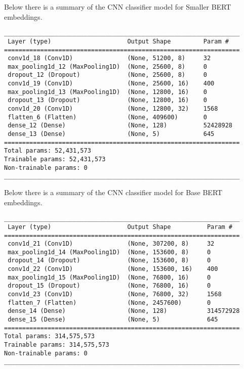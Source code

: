 Below there is a summary of the CNN classifier model for Smaller BERT embeddings.
\begin{verbatim}
_________________________________________________________________
 Layer (type)                     Output Shape         Param #   
=================================================================
 conv1d_18 (Conv1D)               (None, 51200, 8)     32        
 max_pooling1d_12 (MaxPooling1D)  (None, 25600, 8)     0                                    
 dropout_12 (Dropout)             (None, 25600, 8)     0         
 conv1d_19 (Conv1D)               (None, 25600, 16)    400       
 max_pooling1d_13 (MaxPooling1D)  (None, 12800, 16)    0                                    
 dropout_13 (Dropout)             (None, 12800, 16)    0         
 conv1d_20 (Conv1D)               (None, 12800, 32)    1568      
 flatten_6 (Flatten)              (None, 409600)       0         
 dense_12 (Dense)                 (None, 128)          52428928  
 dense_13 (Dense)                 (None, 5)            645       
=================================================================
Total params: 52,431,573
Trainable params: 52,431,573
Non-trainable params: 0
_________________________________________________________________

\end{verbatim}

Below there is a summary of the CNN classifier model for Base BERT embeddings.
\begin{verbatim}
_________________________________________________________________
 Layer (type)                     Output Shape          Param #   
=================================================================
 conv1d_21 (Conv1D)               (None, 307200, 8)     32        
 max_pooling1d_14 (MaxPooling1D)  (None, 153600, 8)     0        
 dropout_14 (Dropout)             (None, 153600, 8)     0         
 conv1d_22 (Conv1D)               (None, 153600, 16)    400       
 max_pooling1d_15 (MaxPooling1D)  (None, 76800, 16)     0         
 dropout_15 (Dropout)             (None, 76800, 16)     0         
 conv1d_23 (Conv1D)               (None, 76800, 32)     1568      
 flatten_7 (Flatten)              (None, 2457600)       0         
 dense_14 (Dense)                 (None, 128)           314572928 
 dense_15 (Dense)                 (None, 5)             645       
=================================================================
Total params: 314,575,573
Trainable params: 314,575,573
Non-trainable params: 0
_________________________________________________________________

\end{verbatim}

